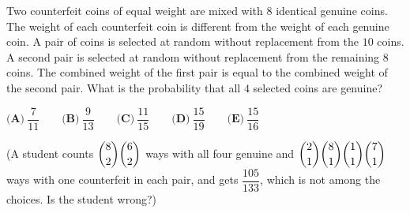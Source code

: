 Two counterfeit coins of equal weight are mixed with $8$ identical genuine coins. The weight of each counterfeit coin is different from the weight of each genuine coin. A pair of coins is selected at random without replacement from the $10$ coins. A second pair is selected at random without replacement from the remaining $8$ coins. The combined weight of the first pair is equal to the combined weight of the second pair. What is the probability that all $4$ selected coins are genuine?

$\textbf{(A)}\ \dfrac{7}{11}\qquad\textbf{(B)}\ \dfrac{9}{13}\qquad\textbf{(C)}\ \dfrac{11}{15}\qquad\textbf{(D)}\ \dfrac{15}{19}\qquad\textbf{(E)}\ \dfrac{15}{16}$

(A student counts $\dbinom82\dbinom62$ ways with all four genuine and $\dbinom21\dbinom81\dbinom11\dbinom71$ ways with one counterfeit in each pair, and gets $\dfrac{105}{133}$, which is not among the choices. Is the student wrong?)
